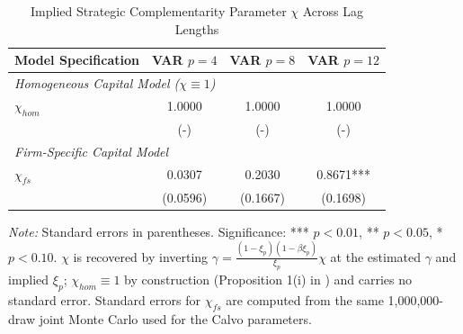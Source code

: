 \begin{table}[htpb]
    \centering
    \small
    \renewcommand{\arraystretch}{1.2}
    \caption{Implied Strategic Complementarity Parameter $\chi$ Across Lag Lengths}
    \label{tab:chi_comparison_4_8_12}
    \begin{tabular}{lccc}
        \toprule
        \textbf{Model Specification} & \textbf{VAR $p=4$} & \textbf{VAR $p=8$} & \textbf{VAR $p=12$} \\
        \midrule

        \multicolumn{4}{l}{\textit{Homogeneous Capital Model ($\chi \equiv 1$)}} \\
        $\chi_{hom}$ & 1.0000 & 1.0000 & 1.0000 \\
        & (-) & (-) & (-) \\

        \midrule
        \multicolumn{4}{l}{\textit{Firm-Specific Capital Model}} \\
        $\chi_{fs}$ & 0.0307 & 0.2030 & 0.8671*** \\
        & (0.0596) & (0.1667) & (0.1698) \\

        \bottomrule
    \end{tabular}

    \vspace{0.2cm}
    \centering
    \scriptsize{\textit{Note:} Standard errors in parentheses. Significance: *** $p<0.01$, ** $p<0.05$, * $p<0.10$. $\chi$ is recovered by inverting $\gamma = \frac{(1-\xi_p)(1-\beta\xi_p)}{\xi_p}\chi$ at the estimated $\gamma$ and implied $\xi_p$; $\chi_{hom} \equiv 1$ by construction (Proposition 1(i) in \citealp{ACEL2011}) and carries no standard error. Standard errors for $\chi_{fs}$ are computed from the same 1{,}000{,}000-draw joint Monte Carlo used for the Calvo parameters.}
\end{table}
